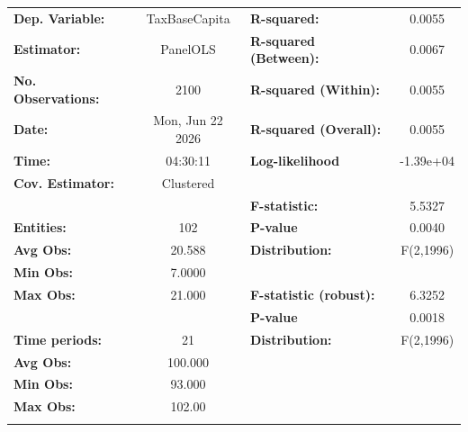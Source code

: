 \begin{center}
\begin{tabular}{lclc}
\toprule
\textbf{Dep. Variable:}          &   TaxBaseCapita    & \textbf{  R-squared:         }   &      0.0055      \\
\textbf{Estimator:}              &      PanelOLS      & \textbf{  R-squared (Between):}  &      0.0067      \\
\textbf{No. Observations:}       &        2100        & \textbf{  R-squared (Within):}   &      0.0055      \\
\textbf{Date:}                   &  Mon, Jun 22 2026  & \textbf{  R-squared (Overall):}  &      0.0055      \\
\textbf{Time:}                   &      04:30:11      & \textbf{  Log-likelihood     }   &    -1.39e+04     \\
\textbf{Cov. Estimator:}         &     Clustered      & \textbf{                     }   &                  \\
\textbf{}                        &                    & \textbf{  F-statistic:       }   &      5.5327      \\
\textbf{Entities:}               &        102         & \textbf{  P-value            }   &      0.0040      \\
\textbf{Avg Obs:}                &       20.588       & \textbf{  Distribution:      }   &    F(2,1996)     \\
\textbf{Min Obs:}                &       7.0000       & \textbf{                     }   &                  \\
\textbf{Max Obs:}                &       21.000       & \textbf{  F-statistic (robust):} &      6.3252      \\
\textbf{}                        &                    & \textbf{  P-value            }   &      0.0018      \\
\textbf{Time periods:}           &         21         & \textbf{  Distribution:      }   &    F(2,1996)     \\
\textbf{Avg Obs:}                &      100.000       & \textbf{                     }   &                  \\
\textbf{Min Obs:}                &       93.000       & \textbf{                     }   &                  \\
\textbf{Max Obs:}                &       102.00       & \textbf{                     }   &                  \\
\textbf{}                        &                    & \textbf{                     }   &                  \\

\end{tabular}
\end{center}
